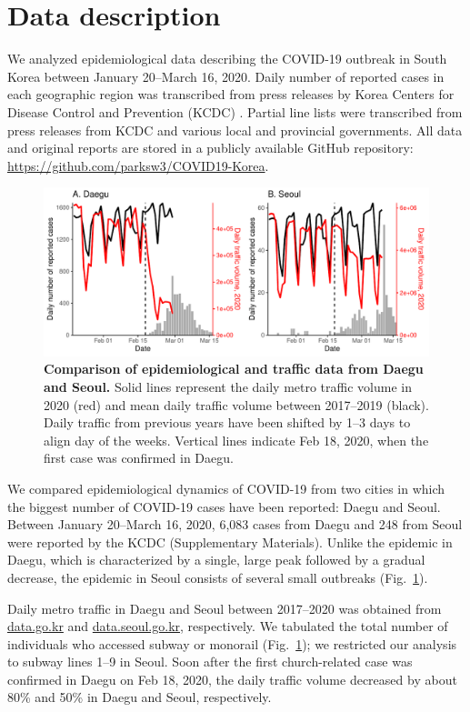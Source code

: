 \documentclass[12pt]{article}
\newcommand{\fref}[1]{Fig.~\ref{fig:#1}}
\begin{document}
\section{Data description}

We analyzed epidemiological data describing the COVID-19 outbreak in South Korea between January 20--March 16, 2020.
Daily number of reported cases in each geographic region was transcribed from press releases by Korea Centers for Disease Control and Prevention (KCDC) \cite{kcdc}.
Partial line lists were transcribed from press releases from KCDC and various local and provincial governments.
All data and original reports are stored in a publicly available GitHub repository: \url{https://github.com/parksw3/COVID19-Korea}.

\begin{figure}[!h]
\includegraphics[width=\textwidth]{figure_compare_report.pdf}
\caption{
\textbf{Comparison of epidemiological and traffic data from Daegu and Seoul.}
Solid lines represent the daily metro traffic volume in 2020 (red) and mean daily traffic volume between 2017--2019 (black).
Daily traffic from previous years have been shifted by 1--3 days to align day of the weeks.
Vertical lines indicate Feb 18, 2020, when the first case was confirmed in Daegu.
}
\label{fig:data}
\end{figure}

We compared epidemiological dynamics of COVID-19 from two cities in which the biggest number of COVID-19 cases have been reported: Daegu and Seoul.
Between January 20--March 16, 2020, 6,083 cases from Daegu and 248 from Seoul were reported by the KCDC (Supplementary Materials).
Unlike the epidemic in Daegu, which is characterized by a single, large peak followed by a gradual decrease, the epidemic in Seoul consists of several small outbreaks (\fref{data}).

Daily metro traffic in Daegu and Seoul between 2017--2020 was obtained from \url{data.go.kr} and \url{data.seoul.go.kr}, respectively.
We tabulated the total number of individuals who accessed subway or monorail (\fref{data});
we restricted our analysis to subway lines 1--9 in Seoul.
Soon after the first church-related case was confirmed in Daegu on Feb 18, 2020, the daily traffic volume decreased by about 80\% and 50\% in Daegu and Seoul, respectively.
\end{document}
